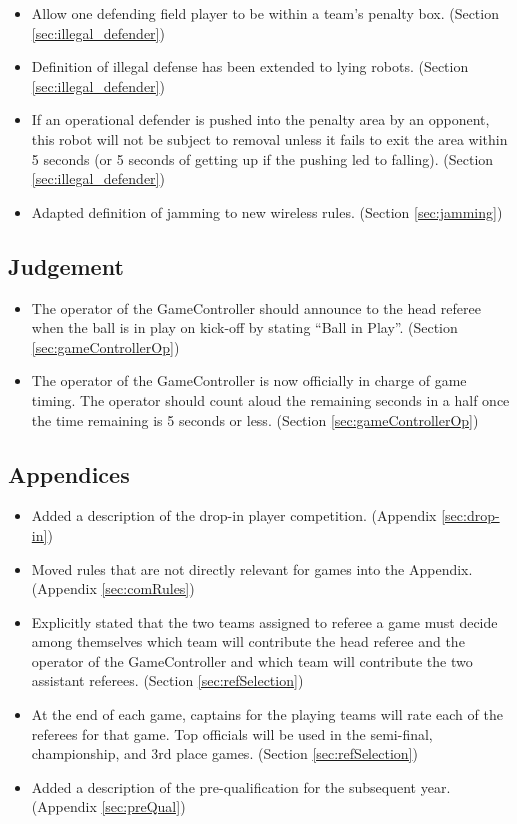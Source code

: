 \documentclass[12pt]{article}
\begin{document}
\begin{itemize}
	\item Allow one defending field player to be within a team's penalty box. (Section \ref{sec:illegal_defender})
    \item Definition of illegal defense has been extended to lying robots. (Section \ref{sec:illegal_defender})
	\item If an operational defender is pushed into the penalty area by an opponent, this robot will not be subject to removal unless it fails to exit the area within 5 seconds (or 5 seconds of getting up if the pushing led to falling). (Section \ref{sec:illegal_defender})
	\item Adapted definition of jamming to new wireless rules. (Section \ref{sec:jamming})
\end{itemize}

\subsection*{Judgement}
\begin{itemize}
	\item The operator of the GameController should announce to the head referee when the ball is in play on kick-off by stating ``Ball in Play''. (Section \ref{sec:gameControllerOp})
	\item The operator of the GameController is now officially in charge of game timing.  The operator should count aloud the remaining seconds in a half once the time remaining is 5 seconds or less. (Section \ref{sec:gameControllerOp})
\end{itemize}

\subsection*{Appendices}
\begin{itemize}	
	\item Added a description of the drop-in player competition. (Appendix \ref{sec:drop-in})
	\item Moved rules that are not directly relevant for games into the Appendix. (Appendix \ref{sec:comRules})
	\item Explicitly stated that the two teams assigned to referee a game must decide among themselves which team will contribute the head referee and the operator of the GameController and which team will contribute the two assistant referees. (Section \ref{sec:refSelection})
	\item At the end of each game, captains for the playing teams will rate each of the referees for that game.  Top officials will be used in the semi-final, championship, and 3rd place games. (Section \ref{sec:refSelection})
	\item Added a description of the pre-qualification for the subsequent year. (Appendix \ref{sec:preQual})
\end{itemize}
\end{document}
